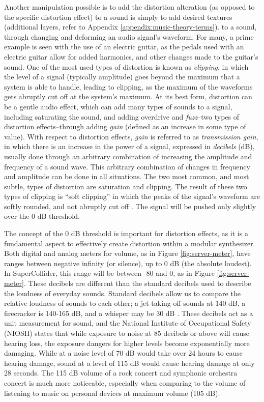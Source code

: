 Another manipulation possible is to add the distortion alteration (as opposed to the specific distortion effect) to a sound is simply to add desired textures (additional layers, refer to Appendix \ref{appendix:music-theory-terms}). to a sound, through changing and deforming an audio signal's waveform. For many, a prime example is seen with the use of an electric guitar, as the pedals used with an electric guitar allow for added harmonics, and other changes made to the guitar's sound. One of the most used types of distortion is known as \textit{clipping}, in which the level of a signal (typically amplitude) goes beyond the maximum that a system is able to handle, leading to clipping, as the maximum of the waveforms gets abruptly cut off at the system's maximum. At its best form, distortion can be a gentle audio effect, which can add many types of sounds to a signal, including saturating the sound, and adding overdrive and \textit{fuzz}--two types of distortion effects--through adding \textit{gain} (defined as an increase in some type of value). With respect to distortion effects, \textit{gain} is referred to as \textit{transmission gain}, in which there is an increase in the power of a signal, expressed in \textit{decibels} (dB), usually done through an arbitrary combination of increasing the amplitude and frequency of a sound wave. This arbitrary combination of changes in frequency and amplitude can be done in all situations. The two most common, and most subtle, types of distortion are saturation and clipping. The result of these two types of clipping is ``soft clipping'' in which the peaks of the signal's waveform are softly rounded, and not abruptly cut off \cite{Tarr_2019}. The signal will be pushed only slightly over the 0 dB threshold. 

The concept of the 0 dB threshold is important for distortion effects, as it is a fundamental aspect to effectively create distortion within a modular synthesizer. Both digital and analog meters for volume, as in Figure \ref{fig:server-meter}, have ranges between negative infinity (or silence), up to 0 dB (the absolute loudest). In SuperCollider, this range will be between -80 and 0, as in Figure \ref{fig:server-meter}. These decibels are different than the standard decibels used to describe the loudness of everyday sounds. Standard decibels allow us to compare the relative loudness of sounds to each other; a jet taking off sounds at 140 dB, a firecracker is 140-165 dB, and a whisper may be 30 dB \cite{Hearing_Health_Foundation}. These decibels act as a unit measurement for sound, and the National Institute of Occupational Safety (NIOSH) \cite{Hearing_Health_Foundation} states that while exposure to noise at 85 decibels or above  will cause hearing loss, the exposure dangers for higher levels become exponentially more damaging. While at a noise level of 70 dB would take over 24 hours to cause hearing damage, sound at a level of 115 dB would cause hearing damage at only 28 seconds. The 115 dB volume of a rock concert and symphonic orchestra concert is much more noticeable, especially when comparing to the volume of listening to music on personal devices at maximum volume (105 dB).

